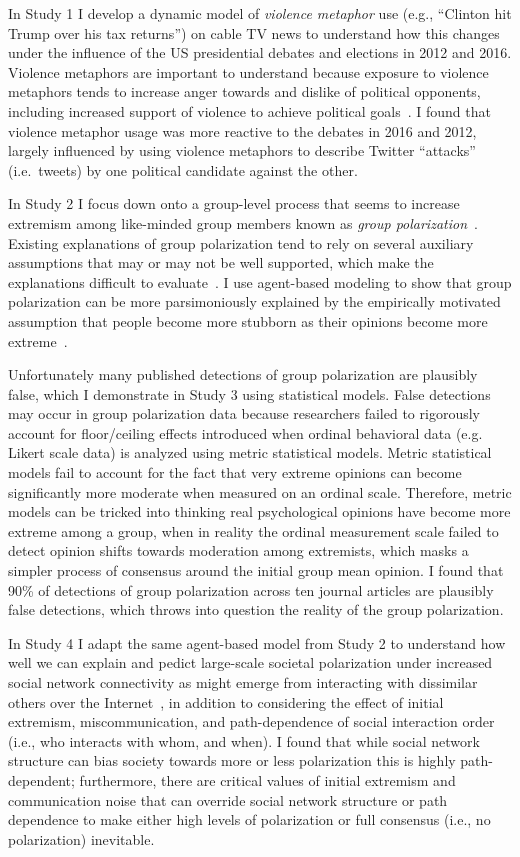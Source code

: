 In Study 1 I develop a dynamic model of \emph{violence metaphor} use (e.g.,
``Clinton hit Trump over his tax returns'') on cable TV news to understand how
this changes under the influence of the US presidential debates and elections
in 2012 and 2016. Violence metaphors are important to understand because 
exposure to violence metaphors tends to increase anger towards and dislike of 
political opponents, including increased support of violence to achieve
political goals~\cite{Kalmoe2014,Kalmoe2018}.
I found that violence metaphor usage was more reactive to
the debates in 2016 and 2012, largely influenced by using violence metaphors
to describe Twitter ``attacks'' (i.e.\ tweets) by one political candidate
against the other. 

In Study 2 I focus down onto a group-level process that seems
to increase extremism among like-minded group members known as
\emph{group polarization}~\cite{Brown1986,Isenberg1986,Brown2000,Sunstein2002}.
Existing explanations of group polarization tend to rely on several auxiliary
assumptions that may or may not be well supported, which make the explanations
difficult to evaluate~\cite{Meehl1990}. I use agent-based modeling to
show that group polarization can
be more parsimoniously explained by the empirically motivated assumption 
that people become more stubborn as their opinions become more 
extreme~\cite{Reiss2019,Zmigrod2019a}. 

Unfortunately many published detections
of group polarization are plausibly false, which I demonstrate in
Study 3 using statistical models. False detections may occur in group polarization
data because researchers failed to rigorously account for floor/ceiling effects
introduced when ordinal behavioral data (e.g. Likert scale data) is analyzed
using metric statistical models. Metric statistical models fail to account for
the fact that very extreme opinions can become significantly more moderate
when measured on an ordinal scale. Therefore, metric models can be tricked into
thinking real psychological opinions have become more extreme among a group,
when in reality the ordinal measurement scale failed to detect opinion shifts
towards moderation among extremists, 
which masks a simpler process of consensus around the initial group mean opinion.
I found that 90\% of detections of group polarization across ten journal articles
are plausibly false detections, which throws into question the reality of
the group polarization.

In Study 4 I adapt the same agent-based
model from Study 2 to understand how well we can explain and pedict large-scale
societal polarization under increased 
social network connectivity as might emerge from interacting with dissimilar
others over the Internet~\cite{Bail2018}, in addition to considering the effect
of initial extremism, miscommunication, and path-dependence of social interaction
order (i.e., who interacts with whom, and when). I found that while social network
structure can bias society towards more or less polarization this is highly
path-dependent; furthermore, there are critical values of initial extremism
and communication noise that can override social network structure or path 
dependence to make either high levels of polarization or full consensus 
(i.e., no polarization) inevitable.

